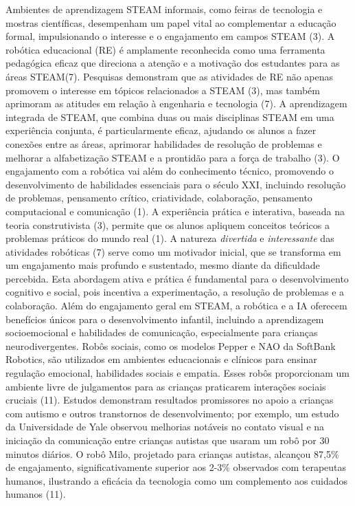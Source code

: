 \documentclass[%
  a4paper,%
  12pt,%
  fleqn,%
  english,%
  brazilian,%
]{article}
\begin{document}
Ambientes de aprendizagem STEAM informais, como feiras de tecnologia e mostras científicas, desempenham um papel vital ao complementar a educação formal, impulsionando o interesse e o engajamento em campos STEAM (3). A robótica educacional (RE) é amplamente reconhecida como uma ferramenta pedagógica eficaz que direciona a atenção e a motivação dos estudantes para as áreas STEAM(7). Pesquisas demonstram que as atividades de RE não apenas promovem o interesse em tópicos relacionados a STEAM (3), mas também aprimoram as atitudes em relação à engenharia e tecnologia (7). A aprendizagem integrada de STEAM, que combina duas ou mais disciplinas STEAM em uma experiência conjunta, é particularmente eficaz, ajudando os alunos a fazer conexões entre as áreas, aprimorar habilidades de resolução de problemas e melhorar a alfabetização STEAM e a prontidão para a força de trabalho (3).
O engajamento com a robótica vai além do conhecimento técnico, promovendo o desenvolvimento de habilidades essenciais para o século XXI, incluindo resolução de problemas, pensamento crítico, criatividade, colaboração, pensamento computacional e comunicação (1). A experiência prática e interativa, baseada na teoria construtivista (3), permite que os alunos apliquem conceitos teóricos a problemas práticos do mundo real (1). A natureza \emph{divertida} e \emph{interessante} das atividades robóticas (7) serve como um motivador inicial, que se transforma em um engajamento mais profundo e sustentado, mesmo diante da dificuldade percebida. Esta abordagem ativa e prática é fundamental para o desenvolvimento cognitivo e social, pois incentiva a experimentação, a resolução de problemas e a colaboração.
Além do engajamento geral em STEAM, a robótica e a IA oferecem benefícios únicos para o desenvolvimento infantil, incluindo a aprendizagem socioemocional e habilidades de comunicação, especialmente para crianças neurodivergentes. Robôs sociais, como os modelos Pepper e NAO da SoftBank Robotics, são utilizados em ambientes educacionais e clínicos para ensinar regulação emocional, habilidades sociais e empatia. Esses robôs proporcionam um ambiente livre de julgamentos para as crianças praticarem interações sociais cruciais (11). Estudos demonstram resultados promissores no apoio a crianças com autismo e outros transtornos de desenvolvimento; por exemplo, um estudo da Universidade de Yale observou melhorias notáveis no contato visual e na iniciação da comunicação entre crianças autistas que usaram um robô por 30 minutos diários. O robô Milo, projetado para crianças autistas, alcançou 87,5\% de engajamento, significativamente superior aos 2-3\% observados com terapeutas humanos, ilustrando a eficácia da tecnologia como um complemento aos cuidados humanos (11).
\end{document}
